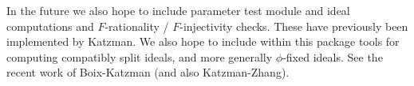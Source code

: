 \documentclass[11pt,fullpage]{amsart}
\theoremstyle{definition}
\theoremstyle{remark}
\begin{document}
In the future we also hope to include parameter test module and ideal computations and $F$-rationality / $F$-injectivity checks.  These have previously been implemented by Katzman.  We also hope to include within this package tools for computing compatibly split ideals, and more generally $\phi$-fixed ideals.  See the recent work of Boix-Katzman (and also Katzman-Zhang).
\end{document}
